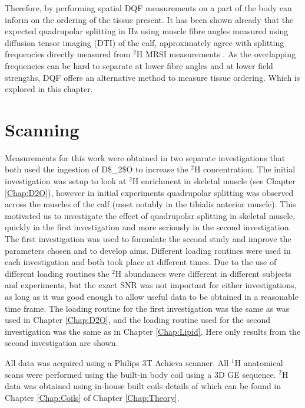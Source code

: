 Therefore, by performing spatial \ac{DQF} measurements on a part of the body can inform on the ordering of the tissue present. It has been shown already that the expected quadrupolar splitting in Hz using muscle fibre angles measured using diffusion tensor imaging (DTI) of the calf, approximately agree with splitting frequencies directly measured from $^2$H MRSI measurements \cite{Gursan2022ResidualMuscle}. As the overlapping frequencies can be hard to separate at lower fibre angles and at lower field strengths, \ac{DQF} offers an alternative method to measure tissue ordering. Which is explored in this chapter.    

\section{Scanning}

Measurements for this work were obtained in two separate investigations that both used the ingestion of \ac{D$_2$O} to increase the $^2$H concentration. The initial investigation was setup to look at $^2$H enrichment in skeletal muscle (see Chapter \ref{Chap:D2O}), however in initial experiments quadrupolar splitting was observed across the muscles of the calf (most notably in the tibialis anterior muscle). This motivated us to investigate the effect of quadrupolar splitting in skeletal muscle, quickly in the first investigation and more seriously in the second investigation. The first investigation was used to formulate the second study and improve the parameters chosen and to develop aims. Different loading routines were used in each investigation and both took place at different times. Due to the use of different loading routines the $^2$H abundances were different in different subjects and experiments, but the exact \ac{SNR} was not important for either investigations, as long as it was good enough to allow useful data to be obtained in a reasonable time frame. The loading routine for the first investigation was the same as was used in Chapter \ref{Chap:D2O}, and the loading routine used for the second investigation was the same as in Chapter \ref{Chap:Lipid}. Here only results from the second investigation are shown.

All data was acquired using a Philips 3T Achieva scanner. All $^1$H anatomical scans were performed using the built-in body coil using a 3D \ac{GE} sequence. $^2$H data was obtained using in-house built coils details of which can be found in Chapter \ref{Chap:Coils} of Chapter \ref{Chap:Theory}. 

